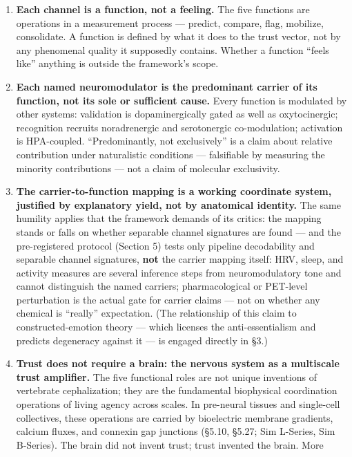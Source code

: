 \documentclass[
]{article}
\providecommand{\tightlist}{%
  \setlength{\itemsep}{0pt}\setlength{\parskip}{0pt}}
\begin{document}
\begin{enumerate}
\def\labelenumi{\arabic{enumi}.}
\tightlist
\item
  \textbf{Each channel is a function, not a feeling.} The five functions
  are operations in a measurement process --- predict, compare, flag,
  mobilize, consolidate. A function is defined by what it does to the
  trust vector, not by any phenomenal quality it supposedly contains.
  Whether a function ``feels like'' anything is outside the framework's
  scope.
\item
  \textbf{Each named neuromodulator is the predominant carrier of its
  function, not its sole or sufficient cause.} Every function is
  modulated by other systems: validation is dopaminergically gated as
  well as oxytocinergic; recognition recruits noradrenergic and
  serotonergic co-modulation; activation is HPA-coupled.
  ``Predominantly, not exclusively'' is a claim about relative
  contribution under naturalistic conditions --- falsifiable by
  measuring the minority contributions --- not a claim of molecular
  exclusivity.
\item
  \textbf{The carrier-to-function mapping is a working coordinate
  system, justified by explanatory yield, not by anatomical identity.}
  The same humility applies that the framework demands of its critics:
  the mapping stands or falls on whether separable channel signatures
  are found --- and the pre-registered protocol (Section 5) tests only
  pipeline decodability and separable channel signatures, \textbf{not}
  the carrier mapping itself: HRV, sleep, and activity measures are
  several inference steps from neuromodulatory tone and cannot
  distinguish the named carriers; pharmacological or PET-level
  perturbation is the actual gate for carrier claims --- not on whether
  any chemical is ``really'' expectation. (The relationship of this
  claim to constructed-emotion theory --- which licenses the
  anti-essentialism and predicts degeneracy against it --- is engaged
  directly in §3.)
\item
  \textbf{Trust does not require a brain: the nervous system as a
  multiscale trust amplifier.} The five functional roles are not unique
  inventions of vertebrate cephalization; they are the fundamental
  biophysical coordination operations of living agency across scales. In
  pre-neural tissues and single-cell collectives, these operations are
  carried by bioelectric membrane gradients, calcium fluxes, and
  connexin gap junctions (§5.10, §5.27; Sim L-Series, Sim B-Series). The
  brain did not invent trust; trust invented the brain. More

\end{enumerate}
\end{document}

